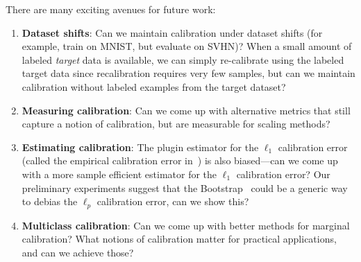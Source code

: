 There are many exciting avenues for future work:
\begin{enumerate}
\item \textbf{Dataset shifts}: Can we maintain calibration under dataset shifts (for example, train on MNIST, but evaluate on SVHN)? When a small amount of labeled \emph{target} data is available, we can simply re-calibrate using the labeled target data since recalibration requires very few samples, but can we maintain calibration without labeled examples from the target dataset?
\item \textbf{Measuring calibration}: Can we come up with alternative metrics that still capture a notion of calibration, but are measurable for scaling methods?
\item \textbf{Estimating calibration}: The plugin estimator for the $\ell_1$ calibration error (called the empirical calibration error in~\cite{guo2017calibration, nixon2019calibration}) is also biased---can we come up with a more sample efficient estimator for the $\ell_1$ calibration error? Our preliminary experiments suggest that the Bootstrap~\cite{efron1979bootstrap} could be a generic way to debias the $\ell_p$ calibration error, can we show this?
\item \textbf{Multiclass calibration}: Can we come up with better methods for marginal calibration? What notions of calibration matter for practical applications, and can we achieve those?

\end{enumerate}

